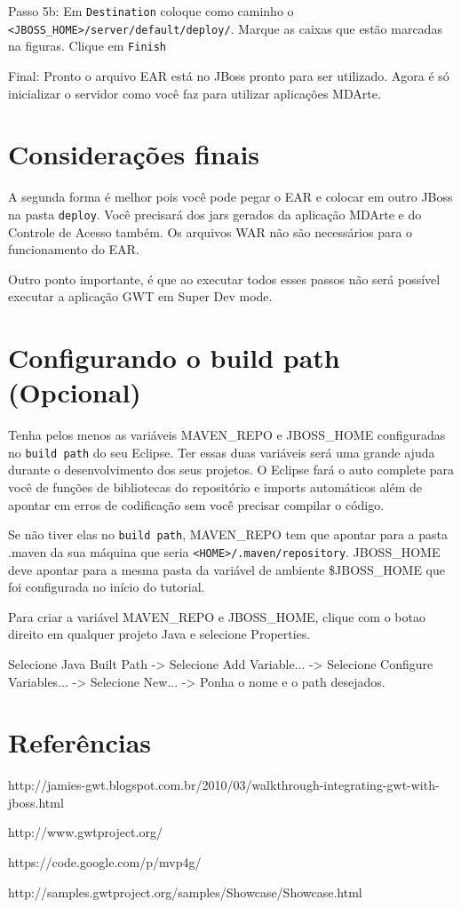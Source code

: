 Passo 5b: Em \texttt{Destination} coloque como caminho o \texttt{<JBOSS\_HOME>/server/default/deploy/}. Marque as caixas que estão
marcadas na figuras. Clique em \texttt{Finish}

Final: Pronto o arquivo EAR está no JBoss pronto para ser utilizado. Agora é só inicializar o servidor como você faz para utilizar
aplicações MDArte.

\section{Considerações finais}

A segunda forma é melhor pois você pode pegar o EAR e colocar em outro JBoss na pasta \texttt{deploy}. Você precisará dos jars
gerados da aplicação MDArte e do Controle de Acesso também. Os arquivos WAR não são necessários para o funcionamento do EAR.

Outro ponto importante, é que ao executar todos esses passos não será possível executar a aplicação GWT em Super Dev mode.


\section{Configurando o build path (Opcional)}

Tenha pelos menos as variáveis MAVEN\_REPO e JBOSS\_HOME configuradas no \texttt{build path} do seu Eclipse. Ter essas duas
variáveis será uma grande ajuda durante o desenvolvimento dos seus projetos. O Eclipse fará o auto complete para você de funções de bibliotecas
do repositório e imports automáticos além de apontar em erros de codificação sem você precisar compilar o código.

Se não tiver elas no \texttt{build path}, MAVEN\_REPO tem que apontar para a pasta .maven da sua máquina que seria
\texttt{<HOME>/.maven/repository}. JBOSS\_HOME deve apontar para a mesma pasta da variável de ambiente \$JBOSS\_HOME que foi
configurada no início do tutorial.

Para criar a variável MAVEN\_REPO e JBOSS\_HOME, clique com o botao direito em qualquer projeto Java e selecione Properties.

Selecione Java Built Path -> Selecione Add Variable... -> Selecione Configure Variables... -> Selecione New... -> Ponha o nome e o path desejados.

\section{Referências}

http://jamies-gwt.blogspot.com.br/2010/03/walkthrough-integrating-gwt-with-jboss.html

http://www.gwtproject.org/

https://code.google.com/p/mvp4g/

http://samples.gwtproject.org/samples/Showcase/Showcase.html
